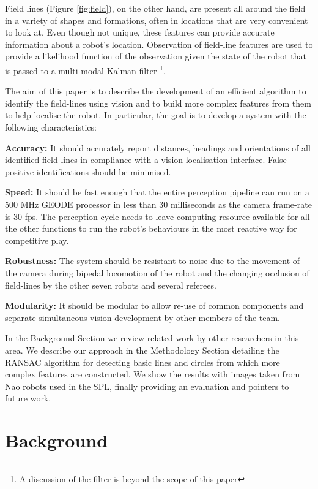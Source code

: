 \documentclass{article}
\begin{document}
Field lines (Figure \ref{fig:field}), on the other hand, are present all around the field in a variety of shapes and formations, often in locations that are very convenient to look at. Even though not unique, these features can provide accurate information about a robot's location. Observation of field-line features are used to provide a likelihood function of the observation given the state of the robot that is passed to a multi-modal Kalman filter \cite{claridge}\footnote{A discussion of the filter is beyond the scope of this paper}. 

The aim of this paper is to describe the development of an efficient algorithm to identify the field-lines using vision and to build more complex features from them to help localise the robot. In particular, the goal is to develop a system with the following characteristics:

{\bf Accuracy:} It should accurately report distances, headings and orientations of all identified field lines in compliance with a vision-localisation interface. False-positive identifications should be minimised. 

{\bf Speed:} It should be fast enough that the entire perception pipeline can run on a 500 MHz GEODE processor in less than 30 milliseconds as the camera frame-rate is 30 fps. The perception cycle needs to leave computing resource available for all the other functions to run the robot's behaviours in the most reactive way for competitive play. 

{\bf Robustness:} The system should be resistant to noise due to the movement of the camera during bipedal locomotion of the robot and the changing occlusion of field-lines by the other seven robots and several referees.

{\bf Modularity:} It should be modular to allow re-use of common components and separate simultaneous vision development by other members of the team.

In the Background Section we review related work by other researchers in this area. We describe our approach in the Methodology Section detailing the RANSAC algorithm for detecting basic lines and circles from which more complex features are constructed. We show the results with images taken from Nao robots used in the SPL, finally providing an evaluation and pointers to future work. 

\section{Background}
\end{document}
